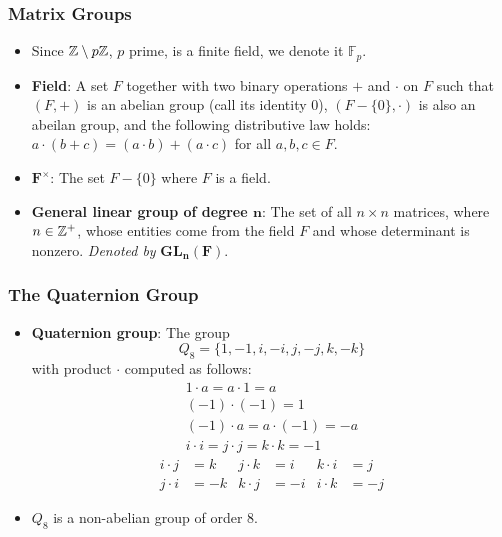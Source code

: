 \documentclass[../main.tex]{subfiles}
\begin{document}
\subsubsection{Matrix Groups}
\begin{itemize}
    \item Since $\mathbb{Z}\setminus p\mathbb{Z}$, $p$ prime, is a finite field, we denote it $\mathbb{F}_p$.
    \item \textbf{Field}: A set $F$ together with two binary operations $+$ and $\cdot$ on $F$ such that $(F,+)$ is an abelian group (call its identity 0), $(F-\{0\},\cdot)$ is also an abeilan group, and the following distributive law holds: $a\cdot(b+c)=(a\cdot b)+(a\cdot c)$ for all $a,b,c\in F$.
    \item $\bm{F^\times}$: The set $F-\{0\}$ where $F$ is a field.
    \item \textbf{General linear group of degree $\bm{n}$}: The set of all $n\times n$ matrices, where $n\in\mathbb{Z}^+$, whose entities come from the field $F$ and whose determinant is nonzero. \emph{Denoted by} $\bm{GL_n(F)}$.
\end{itemize}

\subsubsection{The Quaternion Group}
\begin{itemize}
    \item \textbf{Quaternion group}: The group
    \begin{equation*}
        Q_8 = \{1,-1,i,-i,j,-j,k,-k\}
    \end{equation*}
    with product $\cdot$ computed as follows:
    \begin{gather*}
        1\cdot a = a\cdot 1 = a\tag*{for all $a\in Q_8$}\\
        (-1)\cdot(-1) = 1\\
        (-1)\cdot a = a\cdot(-1) = -a\tag*{for all $a\in Q_8$}\\
        i\cdot i = j\cdot j = k\cdot k = -1
    \end{gather*}
    \begin{align*}
        i\cdot j &= k&
            j\cdot k &= i&
                k\cdot i &= j\\
        j\cdot i &= -k&
            k\cdot j &= -i&
                i\cdot k &= -j
    \end{align*}
    \item $Q_8$ is a non-abelian group of order 8.
\end{itemize}
\end{document}
